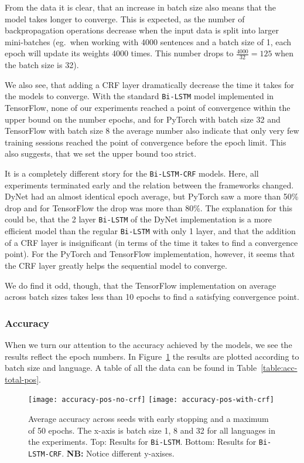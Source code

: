 From the data it is clear, that an increase in batch size also means that the
model takes longer to converge. This is expected, as the number of
backpropagation operations decrease when the input data is split into larger
mini-batches (eg.\ when working with 4000 sentences and a batch size of 1, each
epoch will update its weights 4000 times. This number drops to
$\frac{4000}{32}=125$ when the batch size is 32).

We also see, that adding a CRF layer dramatically decrease the time it takes for
the models to converge. With the standard \texttt{Bi-LSTM} model implemented in
TensorFlow, none of our experiments reached a point of convergence within the
upper bound on the number epochs, and for PyTorch with batch size 32 and
TensorFlow with batch size 8 the average number also indicate that only very few
training sessions reached the point of convergence before the epoch limit. This
also suggests, that we set the upper bound too strict.

It is a completely different story for the \texttt{Bi-LSTM-CRF} models. Here,
all experiments terminated early and the relation between the frameworks
changed.  DyNet had an almost identical epoch average, but PyTorch saw a more
than 50\% drop and for TensorFlow the drop was more than 80\%. The explanation
for this could be, that the 2 layer \texttt{Bi-LSTM} of the DyNet implementation
is a more efficient model than the regular \texttt{Bi-LSTM} with only 1 layer,
and that the addition of a CRF layer is insignificant (in terms of the time it
takes to find a convergence point). For the PyTorch and TensorFlow
implementation, however, it seems that the CRF layer greatly helps the
sequential model to converge.

We do find it odd, though, that the TensorFlow implementation on average across
batch sizes takes less than 10 epochs to find a satisfying convergence point.

\subsubsection{Accuracy}

When we turn our attention to the accuracy achieved by the models, we see the
results reflect the epoch numbers. In
Figure~\ref{chart:acc-by-batch-and-lang-pos} the results are plotted
according to batch size and language. A table of all the data can be found in
Table~\ref{table:acc-total-pos}.

\begin{figure}[h!]
    \texttt{[image: accuracy-pos-no-crf]}
    \texttt{[image: accuracy-pos-with-crf]}
    \caption{Average accuracy across seeds with early stopping and a maximum of
        50 epochs. The x-axis is batch size 1, 8 and 32 for all languages in the
        experiments. Top: Results for \texttt{Bi-LSTM}. Bottom: Results for
    \texttt{Bi-LSTM-CRF}. \textbf{NB:} Notice different y-axises.
    }\label{chart:acc-by-batch-and-lang-pos}
\end{figure}

